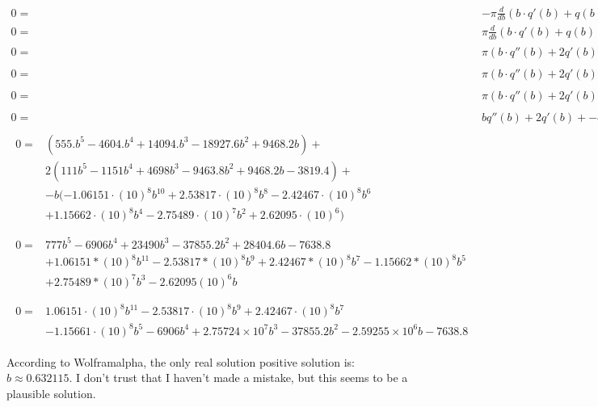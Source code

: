 \documentclass[]{asme2ej}
\begin{document}
\begin{align}
  0 = & - \pi \frac{d}{db} ( b \cdot q'(b) + q(b)) + - k \frac{d}{db}  q(A(b)) \\
  0 = & \pi \frac{d}{db} (b \cdot q'(b) + q(b)) + \frac{1}{10} \frac{d}{db} q(A(b)) \\
  0 = & \pi (b \cdot q''(b) + 2q'(b)) + \frac{1}{10} \frac{d}{db} q( 9.58575 - 5 \pi b^2) \\
  0 = & \pi (b \cdot q''(b) + 2q'(b)) + \frac{1}{10}\cdot -10 \pi b q'(9.58575 - 5 \pi b^2) \\
  0 = & \pi (b \cdot q''(b) + 2q'(b)) + - \pi b q'(9.58575 - 5 \pi b^2) \\
  0 = & b q''(b) + 2q'(b) + - b q'(9.58575 - 5 \pi b^2) \\
   \begin{split}
    0 = & (555. b^5 - 4604. b^4 + 14094. b^3 - 18927.6 b^2 + 9468.2 b)  + \\
    & 2(111 b^5 - 1151 b^4 + 4698 b^3 - 9463.8 b^2 + 9468.2 b - 3819.4) + \\
    & - b (-1.06151\cdot(10)^8 b^{10} + 2.53817\cdot(10)^8 b^8 - 2.42467\cdot(10)^8 b^6 \\
    & + 1.15662\cdot(10)^8 b^4 - 2.75489\cdot(10)^7 b^2 + 2.62095\cdot(10)^6) \\
   \end{split} \\
   \begin{split}
     0 = & 777 b^5 - 6906 b^4 + 23490 b^3 - 37855.2 b^2 + 28404.6 b - 7638.8 \\
     & + 1.06151*(10)^8 b^{11} - 2.53817*(10)^8 b^9 + 2.42467*(10)^8 b^7 - 1.15662*(10)^8 b^5 \\
     & + 2.75489*(10)^7 b^3 - 2.62095(10)^6 b \\
   \end{split} \\
   \begin{split}
     0 = & 1.06151\cdot(10)^8 b^11 - 2.53817\cdot(10)^8 b^9 + 2.42467\cdot(10)^8 b^7 \\
      & - 1.15661\cdot(10)^8 b^5 - 6906 b^4 + 2.75724×10^7 b^3 - 37855.2 b^2 - 2.59255×10^6 b - 7638.8
     \end{split}
\end{align}

According to Wolframalpha, the only real solution positive solution is: $b \approx 0.632115$.
I don't trust that I haven't made a mistake, but this seems to be a plausible solution.

\end{document}
